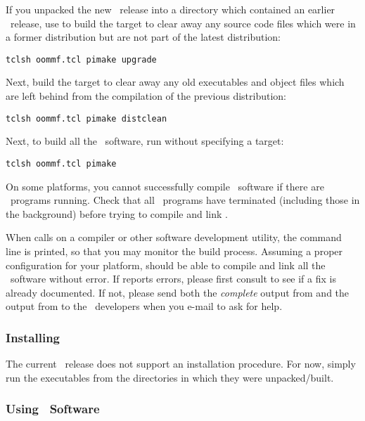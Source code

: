 If you unpacked the new \OOMMF\ release into a directory 
which contained an earlier \OOMMF\ release, 
use  to build the target 
to clear away any source code files which were 
in a former distribution but are not part of the latest distribution:
\begin{verbatim}
tclsh oommf.tcl pimake upgrade
\end{verbatim}

Next, build the target  to clear away any old executables
and object files which are left behind from the compilation of the
previous distribution:
\begin{verbatim}
tclsh oommf.tcl pimake distclean
\end{verbatim}

Next, to build all the \OOMMF\ software, run  without
specifying a target:
\begin{verbatim}
tclsh oommf.tcl pimake
\end{verbatim}
On some platforms, you cannot successfully compile \OOMMF\ software if
there are \OOMMF\ programs running.  Check that all \OOMMF\ programs
have terminated (including those in the background) before trying to
compile and link \OOMMF.

When  calls on a compiler or other software development
utility, the command line is printed, so that you may monitor the build
process.  
Assuming a proper configuration for your platform,  should be
able to compile and link all the \OOMMF\ software without error.  If
 reports errors, please first consult 
to see if a fix is already documented.
If not, please send both the {\em complete} output 
from  and the output from 
to the \OOMMF\ developers when you e-mail to ask for help.

\subsubsection{Installing}

The current \OOMMF\ release does not support an installation procedure.
For now, simply run the executables from the directories in which they
were unpacked/built.

\subsubsection{Using \OOMMF\ Software}

